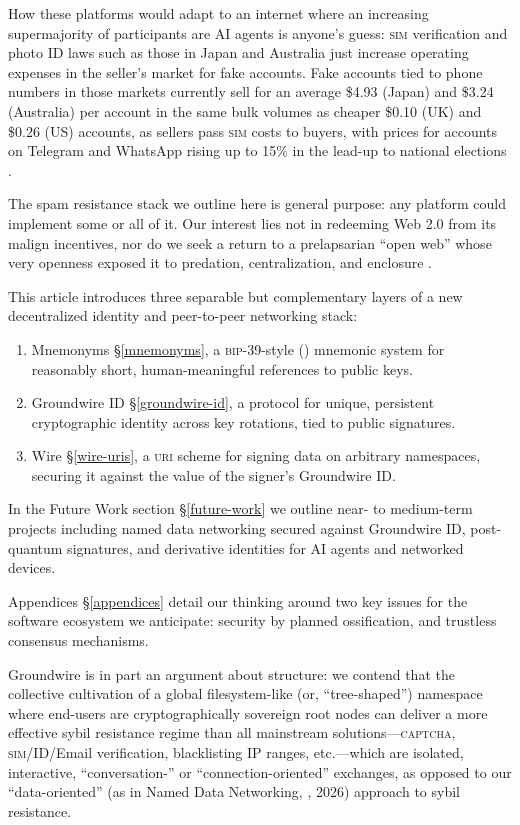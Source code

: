 \documentclass[twoside]{article}
\begin{document}
How these platforms would adapt to an internet where an increasing
supermajority of participants are AI agents is anyone's guess: \textsc{sim}
verification and photo ID laws such as those in Japan and Australia just
increase operating expenses in the seller's market for fake accounts.
Fake accounts tied to phone numbers in those markets currently sell for
an average \$4.93 (Japan) and \$3.24 (Australia) per account in the same
bulk volumes as cheaper \$0.10 (UK) and \$0.26 (US) accounts, as sellers
pass \textsc{sim} costs to buyers, with prices for accounts on Telegram and WhatsApp rising
up to 15\% in the lead-up to national elections \citep{Cambridge2025}.

The spam resistance stack we outline here is general purpose: any
platform could implement some or all of it. Our interest lies not in
redeeming Web 2.0 from its malign incentives, nor do we seek a return
to a prelapsarian ``open web'' whose very openness exposed it to
predation, centralization, and enclosure \citep{Davis2022}.

This article introduces three separable but complementary layers of a new
decentralized identity and peer-to-peer networking stack:

\begin{enumerate}[noitemsep,topsep=2pt]
\def\labelenumi{\arabic{enumi}.}
\item
  \sloppy
  Mnemonyms \S\ref{mnemonyms}, a \textsc{bip}-39-style (\citeyear{BIP0039}) mnemonic system
  for reasonably short, human-meaningful references to public keys.
\item
  \sloppy
  Groundwire ID \S\ref{groundwire-id}, a protocol for unique, persistent cryptographic
  identity across key rotations, tied to public signatures.
\item
  \sloppy
  Wire \S\ref{wire-uris}, a \textsc{uri} scheme for signing data on arbitrary namespaces,
  securing it against the value of the signer's Groundwire ID.
\end{enumerate}

In the Future Work section \S\ref{future-work} we outline near- to
medium-term projects including named data networking secured against
Groundwire ID, post-quantum signatures, and derivative identities for
AI agents and networked devices.

Appendices \S\ref{appendices} detail our thinking around two key
issues for the software ecosystem we anticipate: security by planned
ossification, and trustless consensus mechanisms.

\sloppy
Groundwire is in part an argument about structure: we contend that the
collective cultivation of a global filesystem-like (or, ``tree-shaped'')
namespace where end-users are cryptographically sovereign root nodes can
deliver a more effective sybil resistance regime than all mainstream
solutions---\textsc{captcha}, \textsc{sim}/ID/Email verification,
blacklisting IP ranges, etc.---which are isolated, interactive,
``conversation-'' or ``connection-oriented'' exchanges, as opposed to
our ``data-oriented'' (as in Named Data Networking,
\citeauthor{DirectedMessaging2026}, 2026) approach to sybil resistance.
\end{document}

